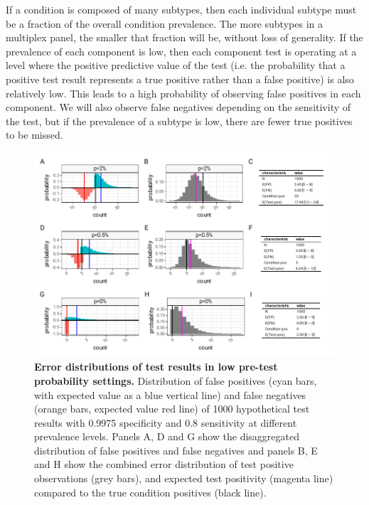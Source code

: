 \documentclass[10pt,letterpaper]{article}
\begin{document}
If a condition is composed of many subtypes, then each individual subtype must be a fraction of the overall condition prevalence. The more subtypes in a multiplex panel, the smaller that fraction will be, without loss of generality. If the prevalence of each component is low, then each component test is operating at a level where the positive predictive value of the test (i.e. the probability that a positive test result represents a true positive rather than a false positive) is also relatively low. This leads to a high probability of observing false positives in each component. We will also observe false negatives depending on the sensitivity of the test, but if the prevalence of a subtype is low, there are fewer true positives to be missed.

\begin{figure}[hb!]
\centerline{\includegraphics{fig/low-prevalence-sensitivity-specificity.pdf}}
\caption{{\bf Error distributions of test results in low pre-test probability settings.}
 Distribution of false positives (cyan bars, with expected value as a blue vertical line) and false negatives (orange bars, expected value red line) of 1000 hypothetical test results with 0.9975 specificity and 0.8 sensitivity at different prevalence levels. Panels A, D and G show the disaggregated distribution of false positives and false negatives and panels B, E and H show the combined error distribution of test positive observations (grey bars), and expected test positivity (magenta line) compared to the true condition positives (black line).}
\label{fig2}
\end{figure}
\end{document}
